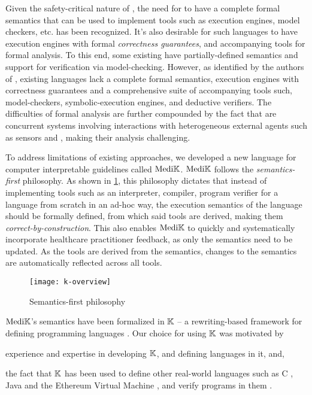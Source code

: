 Given the safety-critical nature of \CDSSs{}, the need for \CIG{} \DSLs{} to
have a complete formal semantics that can be used to implement tools such as
execution engines, model checkers, etc. has been recognized.
It's also desirable for such languages to have execution engines with formal \emph{correctness
guarantees}, and accompanying tools for formal analysis.
To this end, some existing \DSLs{} have partially-defined semantics and
support for verification via model-checking.
However, as identified by the authors of \cite{SuttonAMIA03, ShaharAMIA96},
existing languages lack a complete formal semantics,
execution engines with correctness guarantees
and a comprehensive suite of accompanying tools such, model-checkers, symbolic-execution
engines, and deductive verifiers.
The difficulties of formal analysis are further compounded
by the fact that \CDSSs{} are concurrent systems involving interactions with
heterogeneous external agents such as sensors and \HCPs{}, making their analysis challenging.

To address limitations of existing approaches, we developed a new language
for computer interpretable guidelines called $\text{Medi}\mathbb{K}{}$. $\text{Medi}\mathbb{K}{}$ follows
the \emph{semantics-first} philosophy. As shown in \figurename{}
\ref{fig:semantics-first}, this philosophy dictates that instead of
implementing tools such as an interpreter,
compiler, program verifier for a language from scratch in an ad-hoc way,
the execution semantics of the language should be formally defined, from which
said tools are derived, making them \emph{correct-by-construction}.
This also enables $\text{Medi}\mathbb{K}{}$ to quickly and
systematically incorporate healthcare practitioner feedback, as only the
semantics need to be updated. As the tools are derived from the semantics,
changes to the semantics are automatically reflected across all tools.

\begin{figure}[t!]
  \centering
  \texttt{[image: k-overview]}
  \caption{Semantics-first philosophy}\label{fig:semantics-first}
\end{figure}


$\text{Medi}\mathbb{K}{}{}$'s semantics have been formalized in $\mathbb{K}$ -- a rewriting-based
framework for defining programming languages \cite{KframeworkUrl}. Our
choice for using $\mathbb{K}$ was motivated by
\begin{enumerate*}[label=(\alph*)]
  \item experience and expertise in developing $\mathbb{K}$, and defining languages in
    it, and,
  \item the fact that $\mathbb{K}$ has been used to define other real-world languages such as C
    \cite{HathhornPLDI15}, Java \cite{BogdanasPOPL15} and the Ethereum Virtual
    Machine \cite{HildenbrandtCSF18}, and verify programs in them
    \cite{ParkFSE18,StefanescuOOPSLA16}.
\end{enumerate*}

